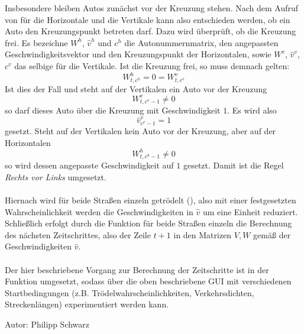 Insbesondere bleiben Autos zunächst vor der Kreuzung stehen. Nach dem Aufruf von  für die
Horizontale und die Vertikale kann also entschieden werden, ob ein Auto den Kreuzungspunkt betreten darf. 
Dazu wird überprüft, ob die Kreuzung frei. Es bezeichne \(W^h\), \(\hat{v}^h\) und \(c^h\) 
die Autonummernmatrix, den angepassten Geschwindigkeitsvektor und den Kreuzungspunkt der Horizontalen, sowie
\(W^v\), \(\hat{v}^v\), \(c^v\) das selbige für die Vertikale. Ist die Kreuzung frei, so muss demnach gelten: 
\[W^h_{t,c^h} = 0 = W^v_{t,c^v}\] 
Ist dies der Fall und steht auf der Vertikalen
ein Auto vor der Kreuzung 
\[W^v_{t,c^v-1} \neq 0\] so darf dieses Auto über die Kreuzung mit Geschwindigkeit \(1\). 
Es wird also 
\[\hat{v}^v_{c^v-1} = 1\] 
gesetzt. Steht auf der Vertikalen kein Auto vor der Kreuzung, 
aber auf der Horizontalen 
\[W^h_{t,c^h-1} \neq 0\]
so wird dessen angepasste Geschwindigkeit auf \(1\) gesetzt. 
Damit ist die Regel \textit{Rechts vor Links} umgesetzt.
\\ \\
Hiernach wird für beide Straßen einzeln getrödelt (), also mit einer festgesetzten Wahrscheinlichkeit werden
die Geschwindigkeiten in \(\hat{v}\) um eine Einheit reduziert. 
Schließlich erfolgt durch die Funktion  für beide Straßen einzeln die Berechnung des nächsten Zeitschrittes, 
also der Zeile \(t+1\) in den Matrizen \(V,W\) gemäß der Geschwindigkeiten \(\hat{v}\).
\\ \\
Der hier beschriebene Vorgang zur Berechnung der Zeitschritte ist in der Funktion  umgesetzt, 
sodass über die oben beschriebene GUI mit verschiedenen Startbedingungen (z.B. Trödelwahrscheinlichkeiten, Verkehrsdichten, Streckenlängen) experimentiert werden kann.

\begin{flushright}
Autor: Philipp Schwarz
\end{flushright}
